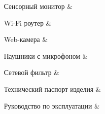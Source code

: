 {        Сенсорный монитор & \\ \hline
        
        Wi-Fi роутер & \\ \hline
        
        Web-камера & \\ \hline
        
        Наушники с микрофоном & \\ \hline
        
        Сетевой фильтр & \\ \hline
        
        Технический паспорт изделия & \\ \hline
        
        Руководство по эксплуатации & \\ \hline      
        
    }

    \or

    \newcommand{\producttype}{РП.В.ЭС}

